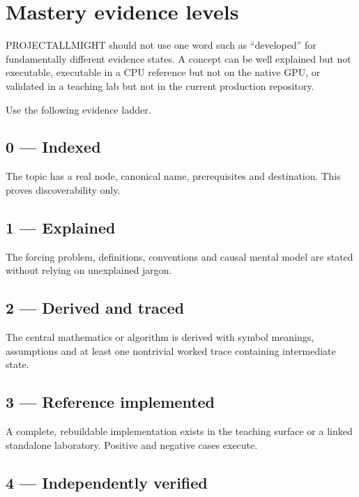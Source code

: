 \hypertarget{appendix-2a2e5bd7143a}{}\label{referencestart:appendix-2a2e5bd7143a}
\section{Mastery evidence levels}\label{appendix-2a2e5bd7143a-mastery-evidence-levels}

PROJECTALLMIGHT should not use one word such as ``developed'' for fundamentally different evidence states. A concept can be well explained but not executable, executable in a CPU reference but not on the native GPU, or validated in a teaching lab but not in the current production repository.

Use the following evidence ladder.

\subsection{0 --- Indexed}\label{appendix-2a2e5bd7143a-indexed}

The topic has a real node, canonical name, prerequisites and destination. This proves discoverability only.

\subsection{1 --- Explained}\label{appendix-2a2e5bd7143a-explained}

The forcing problem, definitions, conventions and causal mental model are stated without relying on unexplained jargon.

\subsection{2 --- Derived and traced}\label{appendix-2a2e5bd7143a-derived-and-traced}

The central mathematics or algorithm is derived with symbol meanings, assumptions and at least one nontrivial worked trace containing intermediate state.

\subsection{3 --- Reference implemented}\label{appendix-2a2e5bd7143a-reference-implemented}

A complete, rebuildable implementation exists in the teaching surface or a linked standalone laboratory. Positive and negative cases execute.

\subsection{4 --- Independently verified}\label{appendix-2a2e5bd7143a-independently-verified}

